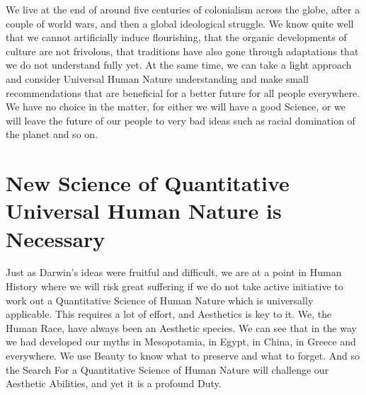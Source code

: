 \documentclass{amsart}
\begin{document}
We live at the end of around five centuries of colonialism across the globe, after a couple of world wars, and then a global ideological struggle.  We know quite well that we cannot artificially induce flourishing, that the organic developments of culture are not frivolous, that traditions have also gone through adaptations that we do not understand fully yet.  At the same time, we can take a light approach and consider Universal Human Nature understanding and make small recommendations that are beneficial for a better future for all people everywhere.  We have no choice in the matter, for either we will have a good Science, or we will leave the future of our people to very bad ideas such as racial domination of the planet and so on.  

\section{New Science of Quantitative Universal Human Nature is Necessary}

Just as Darwin's ideas were fruitful and difficult, we are at a point in Human History where we will risk great suffering if we do not take active initiative to work out a Quantitative Science of Human Nature which is universally applicable.  This requires a lot of effort, and Aesthetics is key to it.  We, the Human Race, have always been an Aesthetic species.  We can see that in the way we had developed our myths in Mesopotamia, in Egypt, in China, in Greece and everywhere.  We use Beauty to know what to preserve and what to forget.  And so the Search For a Quantitative Science of Human Nature will challenge our Aesthetic Abilities, and yet it is a profound Duty.
\end{document}
